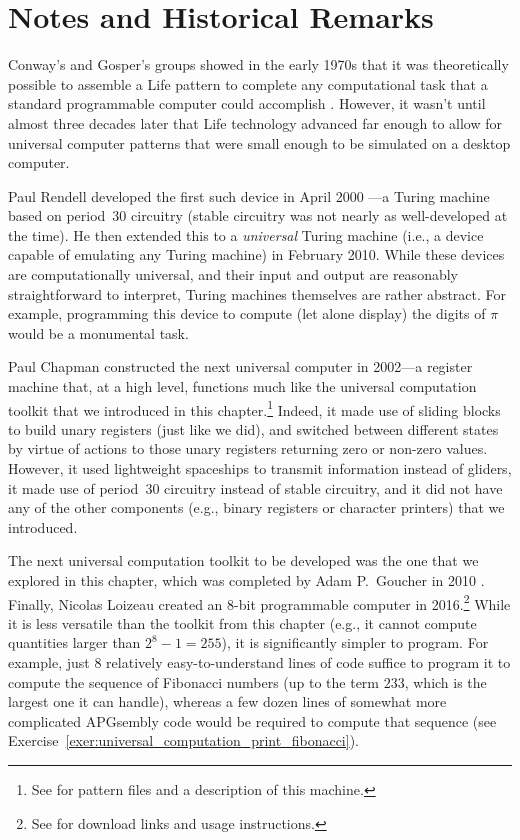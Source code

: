 \section{Notes and Historical Remarks}\label{sec:universal_computation_history}

Conway's and Gosper's groups showed in the early 1970s that it was theoretically possible to assemble a Life pattern to complete any computational task that a standard programmable computer could accomplish \cite{Wain74,BCG82}. However, it wasn't until almost three decades later that Life technology advanced far enough to allow for universal computer patterns that were small enough to be simulated on a desktop computer.

Paul Rendell developed the first such device in April 2000 \cite{RenBook}---a Turing machine based on period~30 circuitry (stable circuitry was not nearly as well-developed at the time). He then extended this to a \emph{universal} Turing machine (i.e., a device capable of emulating any Turing machine) in February 2010. While these devices are computationally universal, and their input and output are reasonably straightforward to interpret, Turing machines themselves are rather abstract. For example, programming this device to compute (let alone display) the digits of $\pi$ would be a monumental task.

Paul Chapman constructed the next universal computer in 2002---a register machine that, at a high level, functions much like the universal computation toolkit that we introduced in this chapter.\footnote{See  for pattern files and a description of this machine.} Indeed, it made use of sliding blocks to build unary registers (just like we did), and switched between different states by virtue of actions to those unary registers returning zero or non-zero values. However, it used lightweight spaceships to transmit information instead of gliders, it made use of period~30 circuitry instead of stable circuitry, and it did not have any of the other components (e.g., binary registers or character printers) that we introduced.

The next universal computation toolkit to be developed was the one that we explored in this chapter, which was completed by Adam P.~Goucher in 2010 \cite{Gou10}. Finally, Nicolas Loizeau created an 8-bit programmable computer in 2016.\footnote{See  for download links and usage instructions.} While it is less versatile than the toolkit from this chapter (e.g., it cannot compute quantities larger than $2^8-1 = 255$), it is significantly simpler to program. For example, just $8$ relatively easy-to-understand lines of code suffice to program it to compute the sequence of Fibonacci numbers (up to the term $233$, which is the largest one it can handle), whereas a few dozen lines of somewhat more complicated APGsembly code would be required to compute that sequence (see Exercise~\ref{exer:universal_computation_print_fibonacci}).

